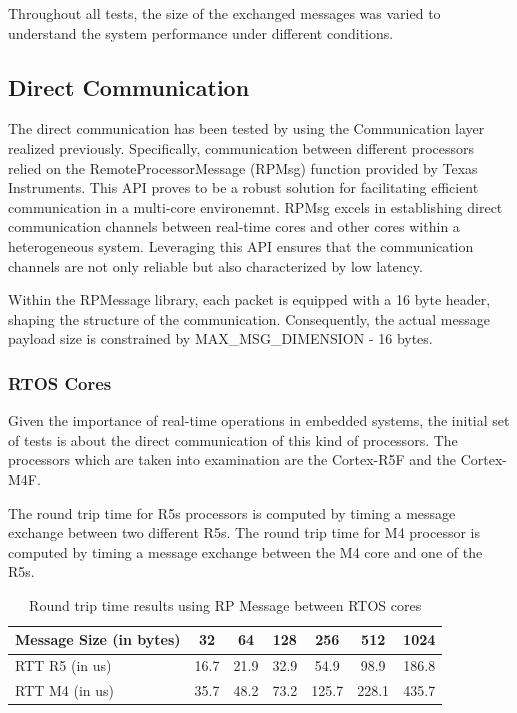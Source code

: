 Throughout all tests, the size of the exchanged messages was varied to
understand the system performance under different conditions.

\subsection{Direct Communication}

The direct communication has been tested by using the Communication layer
realized previously.
Specifically, communication between different processors relied on the
RemoteProcessorMessage (RPMsg) function provided by Texas Instruments.
This API proves to be a robust solution for facilitating efficient
communication in a multi-core environemnt. RPMsg excels in establishing direct
communication channels between real-time cores and other cores within a
heterogeneous system. Leveraging this API ensures that the communication
channels are not only reliable but also characterized by low latency.

Within the RPMessage library, each packet is equipped with a 16 byte header,
shaping the structure of the communication. Consequently, the actual message
payload size is constrained by MAX\_MSG\_DIMENSION - 16 bytes.

\subsubsection{RTOS Cores}

Given the importance of real-time operations in embedded systems, the initial 
set of tests is about the direct communication of this kind of processors.
The processors which are taken into examination are the Cortex-R5F and the
Cortex-M4F.

The round trip time for R5s processors is computed by timing a message exchange
between two different R5s.
The round trip time for M4 processor is computed by timing a message exchange
between the M4 core and one of the R5s.

\begin{table}[H]
\centering
\caption{Round trip time results using RP Message between RTOS cores}
\label{table:direct_communication_RTOS_cores}
\begin{tabular}{lcccccc}
\toprule
Message Size (in bytes) & 32 & 64 & 128 & 256 & 512 & 1024 \\
\midrule
RTT R5 (in us) & 16.7 & 21.9 & 32.9 & 54.9 & 98.9 & 186.8 \\
RTT M4 (in us) & 35.7 & 48.2 & 73.2 & 125.7 & 228.1 & 435.7 \\
\bottomrule
\end{tabular}
\end{table}

